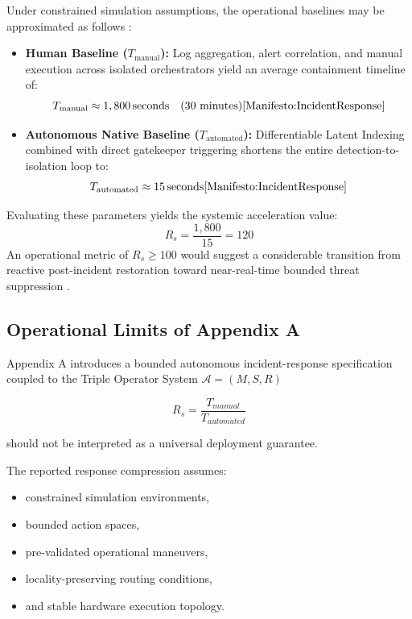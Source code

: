 Under constrained simulation assumptions, the operational baselines may be approximated as follows \cite{DLI:MemoryIntegration}:
\begin{itemize}
    \item \textbf{Human Baseline ($T_{\text{manual}}$):} Log aggregation, alert correlation, and manual execution across isolated orchestrators yield an average containment timeline of:
    \begin{equation}
        T_{\text{manual}} \approx 1,800\,\text{seconds} \quad (30 \text{ minutes}) \cite{Manifesto:IncidentResponse} 
    \end{equation}
    \item \textbf{Autonomous Native Baseline ($T_{\text{automated}}$):} Differentiable Latent Indexing combined with direct gatekeeper triggering shortens the entire detection-to-isolation loop to:
    \begin{equation}
        T_{\text{automated}} \approx 15\,\text{seconds} \cite{Manifesto:IncidentResponse}
    \end{equation}
\end{itemize}

Evaluating these parameters yields the systemic acceleration value:
\begin{equation}
    R_s = \frac{1,800}{15} = 120
\end{equation}
An operational metric of \(R_s \ge 100\) would suggest a considerable transition from reactive post-incident restoration toward near-real-time bounded threat suppression \cite{Manifesto:IncidentResponse}.

\subsection{Operational Limits of Appendix A}

Appendix A introduces a bounded autonomous incident-response specification coupled to the Triple Operator System  $\mathcal{A} = (M, S, R)$

\[
R_s
=
\frac{T_{manual}}{T_{automated}}
\]

should not be interpreted as a universal deployment guarantee.

The reported response compression assumes:

\begin{itemize}
    \item constrained simulation environments,
    \item bounded action spaces,
    \item pre-validated operational maneuvers,
    \item locality-preserving routing conditions,
    \item and stable hardware execution topology.
\end{itemize}

